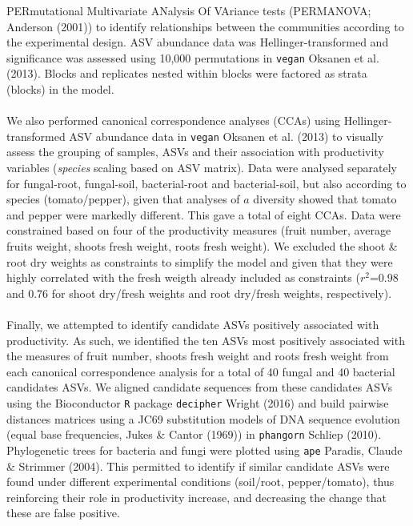 \documentclass[11pt,]{article}
\begin{document}
PERmutational Multivariate ANalysis Of VAriance tests (PERMANOVA;
Anderson (2001)) to identify relationships between the communities
according to the experimental design. ASV abundance data was
Hellinger-transformed and significance was assessed using 10,000
permutations in \texttt{vegan} Oksanen et al. (2013). Blocks and
replicates nested within blocks were factored as strata (blocks) in the
model.\\
\hspace*{0.333em}\\
We also performed canonical correspondence analyses (CCAs) using
Hellinger-transformed ASV abundance data in \texttt{vegan} Oksanen et
al. (2013) to visually assess the grouping of samples, ASVs and their
association with productivity variables (\emph{species} scaling based on
ASV matrix). Data were analysed separately for fungal-root, fungal-soil,
bacterial-root and bacterial-soil, but also according to species
(tomato/pepper), given that analyses of \(a\) diversity showed that
tomato and pepper were markedly different. This gave a total of eight
CCAs. Data were constrained based on four of the productivity measures
(fruit number, average fruits weight, shoots fresh weight, roots fresh
weight). We excluded the shoot \& root dry weights as constraints to
simplify the model and given that they were highly correlated with the
fresh weigth already included as constraints (\(r^2\)=0.98 and 0.76 for
shoot dry/fresh weights and root dry/fresh weights, respectively). ~\\
\hspace*{0.333em}\\
Finally, we attempted to identify candidate ASVs positively associated
with productivity. As such, we identified the ten ASVs most positively
associated with the measures of fruit number, shoots fresh weight and
roots fresh weight from each canonical correspondence analysis for a
total of 40 fungal and 40 bacterial candidates ASVs. We aligned
candidate sequences from these candidates ASVs using the Bioconductor
\texttt{R} package \texttt{decipher} Wright (2016) and build pairwise
distances matrices using a JC69 substitution models of DNA sequence
evolution (equal base frequencies, Jukes \& Cantor (1969)) in
\texttt{phangorn} Schliep (2010). Phylogenetic trees for bacteria and
fungi were plotted using \texttt{ape} Paradis, Claude \& Strimmer
(2004). This permitted to identify if similar candidate ASVs were found
under different experimental conditions (soil/root, pepper/tomato), thus
reinforcing their role in productivity increase, and decreasing the
change that these are false positive.\\
\hspace*{0.333em} ~
\end{document}
